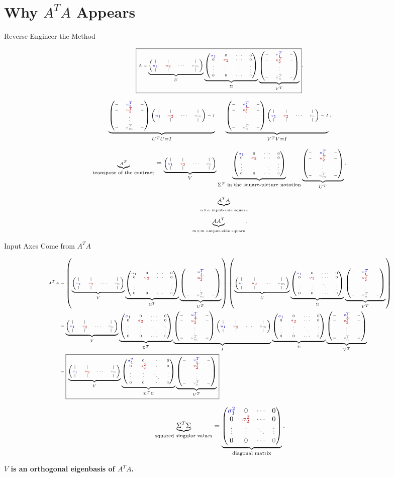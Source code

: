 \documentclass[10pt]{beamer}
\theoremstyle{definition}
\newcommand{\x}[1]{\alert{\textbf{#1}}}
\newcommand{\rd}[1]{{\color{red!70!black}#1}}
\newcommand{\bl}[1]{{\color{blue!70!black}#1}}
\newcommand{\gry}[1]{{\color{gray}#1}}
\newcommand{\Vcols}{\begin{pmatrix}|&|& &|\\ \bl{v_1}&\rd{v_2}&\cdots&\gry{v_n}\\ |&|& &|\end{pmatrix}}
\newcommand{\Ucols}{\begin{pmatrix}|&|& &|\\ \bl{u_1}&\rd{u_2}&\cdots&\gry{u_m}\\ |&|& &|\end{pmatrix}}
\newcommand{\Vrows}{\begin{pmatrix}-&\bl{v_1^T}&-\\ -&\rd{v_2^T}&-\\ &\vdots&\\ -&\gry{v_n^T}&-\end{pmatrix}}
\newcommand{\Urows}{\begin{pmatrix}-&\bl{u_1^T}&-\\ -&\rd{u_2^T}&-\\ &\vdots&\\ -&\gry{u_m^T}&-\end{pmatrix}}
\newcommand{\Sigdisplay}{\begin{pmatrix}\bl{\sigma_1}&0&\cdots&0\\ 0&\rd{\sigma_2}&\cdots&0\\ \vdots&\vdots&\ddots&\vdots\\ 0&0&\cdots&\gry{0}\end{pmatrix}}
\newcommand{\SigTsigdisplay}{\begin{pmatrix}\bl{\sigma_1^2}&0&\cdots&0\\ 0&\rd{\sigma_2^2}&\cdots&0\\ \vdots&\vdots&\ddots&\vdots\\ 0&0&\cdots&\gry{0}\end{pmatrix}}
\newcommand{\svdproduct}{\underbrace{\Ucols}_{U}\underbrace{\Sigdisplay}_{\Sigma}\underbrace{\Vrows}_{V^T}}
\begin{document}
\section{Why $A^TA$ Appears}

\begin{frame}[shrink=30]{Reverse-Engineer the Method}

\[
\tiny
\boxed{
A=
\svdproduct
}.
\]

\[
\tiny
\underbrace{\Urows\Ucols=I}_{U^TU=I}
\qquad
\underbrace{\Vrows\Vcols=I}_{V^TV=I}.
\]

\[
\tiny
\underbrace{A^T}_{\text{transpose of the contract}}
=
\underbrace{\Vcols}_{V}
\underbrace{\begin{pmatrix}
\bl{\sigma_1}&0&\cdots&0\\
0&\rd{\sigma_2}&\cdots&0\\
\vdots&\vdots&\ddots&\vdots\\
0&0&\cdots&\gry{0}
\end{pmatrix}}_{\Sigma^T\text{ in the square-picture notation}}
\underbrace{\Urows}_{U^T}.
\]

\vfill

\[
\scriptsize
\begin{aligned}
\underbrace{A^TA}_{n\times n\text{ input-side square}}\\[0.4em]
\underbrace{AA^T}_{m\times m\text{ output-side square}}.
\end{aligned}
\]

\end{frame}


\begin{frame}[shrink=35]{Input Axes Come from $A^TA$}

\[
\tiny
\begin{aligned}
A^TA
&=
\left(
\underbrace{\Vcols}_{V}
\underbrace{\Sigdisplay}_{\Sigma^T}
\underbrace{\Urows}_{U^T}
\right)
\left(
\underbrace{\Ucols}_{U}
\underbrace{\Sigdisplay}_{\Sigma}
\underbrace{\Vrows}_{V^T}
\right)\\
&=
\underbrace{\Vcols}_{V}
\underbrace{\Sigdisplay}_{\Sigma^T}
\underbrace{\Urows\Ucols}_{I}
\underbrace{\Sigdisplay}_{\Sigma}
\underbrace{\Vrows}_{V^T}\\
&=
\boxed{
\underbrace{\Vcols}_{V}
\underbrace{\SigTsigdisplay}_{\Sigma^T\Sigma}
\underbrace{\Vrows}_{V^T}
}.
\end{aligned}
\]

\vfill

\[
\underbrace{\Sigma^T\Sigma}_{\text{squared singular values}}
=
\underbrace{\SigTsigdisplay}_{\text{diagonal matrix}}.
\]

\vfill

\begin{center}
\x{$V$ is an orthogonal eigenbasis of $A^TA$.}
\end{center}

\end{frame}
\end{document}
